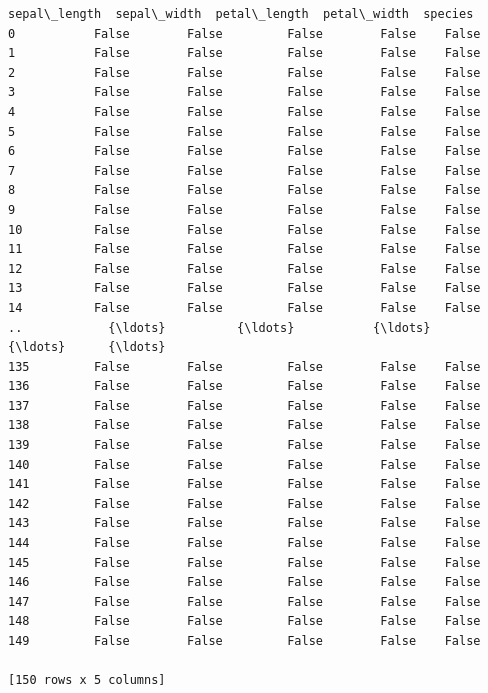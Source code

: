 \documentclass [oneside,10pt,a4paper,ngerman,BCOR10mm,headsepline,parindent,final]{scrartcl}
\makeatletter
\newcommand{\boxspacing}{\kern\kvtcb@left@rule\kern\kvtcb@boxsep}
\newcommand{\prompt}[4]{
        {\ttfamily\llap{{\color{#2}[#3]:\hspace{3pt}#4}}\vspace{-\baselineskip}}
    }
\makeatother
\begin{document}
            \begin{tcolorbox}[breakable, size=fbox, boxrule=.5pt, pad at break*=1mm, opacityfill=0]
\prompt{Out}{outcolor}{102}{\boxspacing}
\begin{Verbatim}[commandchars=\\\{\}]
     sepal\_length  sepal\_width  petal\_length  petal\_width  species
0           False        False         False        False    False
1           False        False         False        False    False
2           False        False         False        False    False
3           False        False         False        False    False
4           False        False         False        False    False
5           False        False         False        False    False
6           False        False         False        False    False
7           False        False         False        False    False
8           False        False         False        False    False
9           False        False         False        False    False
10          False        False         False        False    False
11          False        False         False        False    False
12          False        False         False        False    False
13          False        False         False        False    False
14          False        False         False        False    False
..            {\ldots}          {\ldots}           {\ldots}          {\ldots}      {\ldots}
135         False        False         False        False    False
136         False        False         False        False    False
137         False        False         False        False    False
138         False        False         False        False    False
139         False        False         False        False    False
140         False        False         False        False    False
141         False        False         False        False    False
142         False        False         False        False    False
143         False        False         False        False    False
144         False        False         False        False    False
145         False        False         False        False    False
146         False        False         False        False    False
147         False        False         False        False    False
148         False        False         False        False    False
149         False        False         False        False    False

[150 rows x 5 columns]
\end{Verbatim}
\end{tcolorbox}
        
\end{document}
